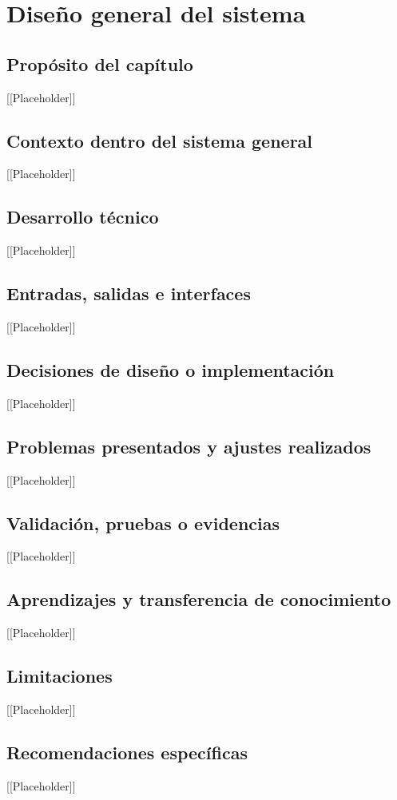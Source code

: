\chapter{Diseño general del sistema}

\section{Propósito del capítulo}
[[Placeholder]]

\section{Contexto dentro del sistema general}
[[Placeholder]]

\section{Desarrollo técnico}
[[Placeholder]]

\section{Entradas, salidas e interfaces}
[[Placeholder]]

\section{Decisiones de diseño o implementación}
[[Placeholder]]

\section{Problemas presentados y ajustes realizados}
[[Placeholder]]

\section{Validación, pruebas o evidencias}
[[Placeholder]]

\section{Aprendizajes y transferencia de conocimiento}
[[Placeholder]]

\section{Limitaciones}
[[Placeholder]]

\section{Recomendaciones específicas}
[[Placeholder]]
